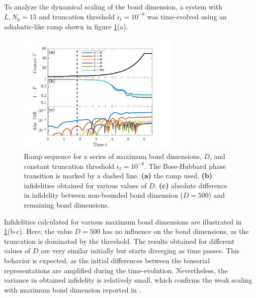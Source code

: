To analyze the dynamical scaling of the bond dimension, a system with $L, N_p = 15$ and truncation threshold $\epsilon_t = 10^{-8}$ was time-evolved using an adiabatic-like ramp shown in figure \ref{fig:BondDimComparison}(a).  
\begin{figure}[h!]
    \centering
    \includegraphics[width=0.7\textwidth]{Figures/BondDim/BondDimComparison.pdf}
    \caption{Ramp sequence for a series of maximum bond dimensions, $D$, and constant truncation threshold $\epsilon_t = 10^{-8}$. The Bose-Hubbard phase transition is marked by a dashed line. \textbf{(a)} the ramp used. \textbf{(b)} infidelities obtained for various values of $D$.  \textbf{(c)} absolute difference in infidelity between non-bounded bond dimension ($D = 500$) and remaining bond dimensions. }
    \label{fig:BondDimComparison}
\end{figure}
Infidelities calculated for various maximum bond dimensions are illustrated in \ref{fig:BondDimComparison}(b-c). Here, the value $D = 500$ has no influence on the bond dimensions, as the truncation is dominated by the threshold. The results obtained for different values of $D$ are very similar initially but starts diverging as time passes. This behavior is expected, as the initial differences between the tensorial representations are amplified during the time-evolution. Nevertheless, the variance in obtained infidelity is relatively small, which confirms the weak scaling with maximum bond dimension reported in \cite{Daley2004}.

